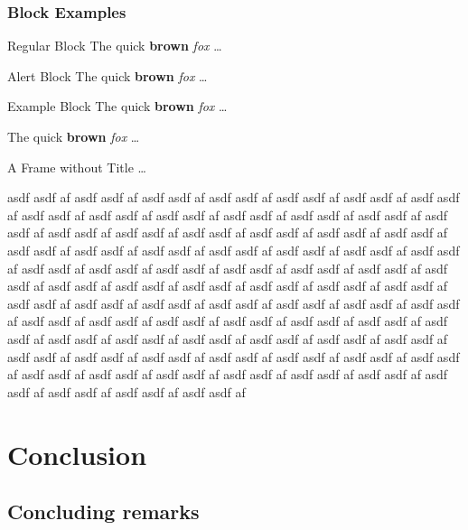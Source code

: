 \documentclass[inverse,aspectratio=169,classification=public-cc-by]{lh-presentation}
\begin{document}
\begin{frame}
\frametitle{Block Examples}
\begin{block}{Regular Block}
The \alert{quick} \textbf{brown} \emph{fox} \ldots
\end{block}
\begin{alertblock}{Alert Block}
The \alert{quick} \textbf{brown} \emph{fox} \ldots
\end{alertblock}
\begin{exampleblock}{Example Block}
The \alert{quick} \textbf{brown} \emph{fox} \ldots
\end{exampleblock}
\begin{quotebox}
The \alert{quick} \textbf{brown} \emph{fox} \ldots
\end{quotebox}

\end{frame}

\begin{frame}
A Frame without Title \ldots

asdf asdf af 
asdf asdf af 
asdf asdf af 
asdf asdf af 
asdf asdf af 
asdf asdf af 
asdf asdf af 
asdf asdf af 
asdf asdf af 
asdf asdf af 
asdf asdf af 
asdf asdf af 
asdf asdf af 
asdf asdf af 
asdf asdf af 
asdf asdf af 
asdf asdf af 
asdf asdf af 
asdf asdf af 
asdf asdf af 
asdf asdf af 
asdf asdf af 
asdf asdf af 
asdf asdf af 
asdf asdf af 
asdf asdf af 
asdf asdf af 
asdf asdf af 
asdf asdf af 
asdf asdf af 
asdf asdf af 
asdf asdf af 
asdf asdf af 
asdf asdf af 
asdf asdf af 
asdf asdf af 
asdf asdf af 
asdf asdf af 
asdf asdf af 
asdf asdf af 
asdf asdf af 
asdf asdf af 
asdf asdf af 
asdf asdf af 
asdf asdf af 
asdf asdf af 
asdf asdf af 
asdf asdf af 
asdf asdf af 
asdf asdf af 
asdf asdf af 
asdf asdf af 
asdf asdf af 
asdf asdf af 
asdf asdf af 
asdf asdf af 
asdf asdf af 
asdf asdf af 
asdf asdf af 
asdf asdf af 
asdf asdf af 
asdf asdf af 
asdf asdf af 
asdf asdf af 
asdf asdf af 
asdf asdf af 
asdf asdf af 
asdf asdf af 
asdf asdf af 
asdf asdf af 
asdf asdf af 
asdf asdf af 
asdf asdf af 
asdf asdf af 
asdf asdf af 
asdf asdf af 
asdf asdf af 
\end{frame}

\section{Conclusion}
\subsection{Concluding remarks}
\end{document}
